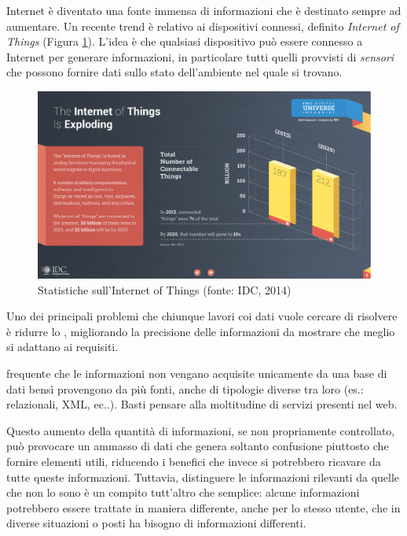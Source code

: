 Internet è diventato una fonte immensa di informazioni che è destinato sempre ad aumentare. Un recente trend è relativo ai dispositivi connessi, definito \emph{Internet of Things} (Figura \ref{fig:statistiche-iot}). L'idea è che qualsiasi dispositivo può essere connesso a Internet per generare informazioni, in particolare tutti quelli provvisti di \emph{sensori} che possono fornire dati sullo stato dell'ambiente nel quale si trovano.

\begin{figure}[ht]
	\centering
	\includegraphics[width=\textwidth]{1-introduzione/Immagini/iot-trend.pdf}
	\caption[Statistiche sull'Internet of Things]{Statistiche sull'Internet of Things (fonte: IDC, 2014)\label{fig:statistiche-iot}}
\end{figure}

Uno dei principali problemi che chiunque lavori coi dati vuole cercare di risolvere è ridurre lo , migliorando la precisione delle informazioni da mostrare che meglio si adattano ai requisiti.

\upe frequente che le informazioni non vengano acquisite unicamente da una base di dati bensì provengono da più fonti, anche di tipologie diverse tra loro (es.: relazionali, XML, ec..). Basti pensare alla moltitudine di servizi presenti nel web.

Questo aumento della quantità di informazioni, se non propriamente controllato, può provocare un ammasso di dati che genera soltanto confusione piuttosto che fornire elementi utili, riducendo i benefici che invece si potrebbero ricavare da tutte queste informazioni. Tuttavia, distinguere le informazioni rilevanti da quelle che non lo sono è un compito tutt'altro che semplice: alcune informazioni potrebbero essere trattate in maniera differente, anche per lo stesso utente, che in diverse situazioni o posti ha bisogno di informazioni differenti. 

